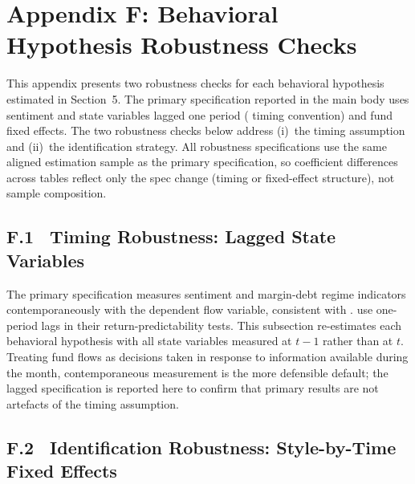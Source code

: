\documentclass[12pt]{article}
\begin{document}
\clearpage

\clearpage
\section*{Appendix F: Behavioral Hypothesis Robustness Checks}
\setcounter{table}{0}
\renewcommand{\thetable}{F.\arabic{table}}

This appendix presents two robustness checks for each behavioral hypothesis
estimated in Section~5. The primary specification reported in the main body
uses sentiment and state variables lagged one period
(\textcite{HuangEtal2015} timing convention) and fund fixed effects. The two
robustness checks below address (i)~the timing assumption and (ii)~the
identification strategy. All robustness specifications use the same aligned
estimation sample as the primary specification, so coefficient differences
across tables reflect only the spec change (timing or fixed-effect
structure), not sample composition.

\subsection*{F.1 \ Timing Robustness: Lagged State Variables}

The primary specification measures sentiment and margin-debt regime indicators contemporaneously with the dependent flow variable, consistent with \textcite{BakerWurgler2007}. \textcite{HuangEtal2015} use one-period lags in their return-predictability tests. This subsection re-estimates each behavioral hypothesis with all state variables measured at $t-1$ rather than at $t$. Treating fund flows as decisions taken in response to information available during the month, contemporaneous measurement is the more defensible default; the lagged specification is reported here to confirm that primary results are not artefacts of the timing assumption.


\newpage

\newpage

\clearpage
\newpage


\subsection*{F.2 \ Identification Robustness: Style-by-Time Fixed Effects}
\end{document}
